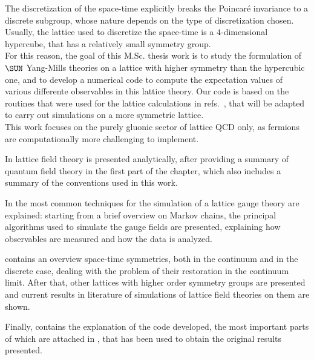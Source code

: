 The discretization of the space-time explicitly breaks the Poincar\'e invariance to a discrete subgroup, whose nature depends on the type of discretization chosen.
Usually, the lattice used to discretize the space-time is a $4$-dimensional hypercube, that has a relatively small symmetry group.\\
For this reason, the goal of this M.Sc. thesis work is to study the formulation of $\SUN$ Yang-Mills theories on a lattice with higher symmetry than the hypercubic one, and to develop a numerical code to compute the expectation values of various differente observables in this lattice theory. Our code is based on the routines that were used for the lattice calculations in refs.~\cite{Panero:2009tv,Mykkanen:2012ri}, that will be adapted to carry out simulations on a more symmetric lattice.\\
This work focuses on the purely gluonic sector of lattice QCD only, as fermions are computationally more challenging to implement.

In  lattice field theory is presented analytically, after providing a summary of quantum field theory in the first part of the chapter, which also includes a summary of the conventions used in this work.

In  the most common techniques for the  simulation of a lattice gauge theory are explained: starting from a brief overview on Markov chains, the principal algorithms used to simulate the gauge fields are presented, explaining how observables are measured and how the data is analyzed.

 contains an overview space-time symmetries, both in the continuum and in the discrete case, dealing with the problem of their restoration in the continuum limit.
After that, other lattices with higher order symmetry groups are presented and current results in literature of simulations of lattice field theories on them are shown.

Finally,  contains the explanation of the code developed, the most important parts of which are attached in , that has been used to obtain the original results presented.
